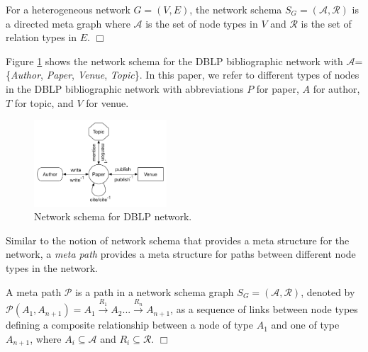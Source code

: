 \begin{definition}For a heterogeneous network $G=(V,E)$, the network schema $S_G=\mathcal{(A,R)}$ is a directed meta graph where $\mathcal{A}$ is the set of node types in $V$ and $\mathcal{R}$ is the set of relation types in $E$.  $\Box$\end{definition}

Figure \ref{schema} shows the network schema for the DBLP bibliographic network with $\mathcal{A}$=\{\textit{Author}, \textit{Paper}, \textit{Venue}, \textit{Topic}\}. In this paper, we refer to different types of nodes in the DBLP bibliographic network with abbreviations $P$ for paper, $A$ for author, $T$ for topic, and $V$ for venue. 

\begin{figure}[t]
\centering
\includegraphics[trim = 0mm 10mm 0mm 0mm,width=0.44\textwidth]{figs/schema.pdf}
\caption{Network schema for DBLP network.}\label{schema}
\end{figure}


Similar to the notion of network schema that provides a meta structure for the network, a \textit{meta path} \cite{sun2011pathsim} provides a meta structure for paths between different node types in the network. 

\begin{definition}A meta path $\mathcal{P}$ is a path in a network schema graph $S_G = (\mathcal{A,R})$, denoted by $\mathcal{P}(A_1,A_{n+1}) = A_1 \xrightarrow{R_1} A_2... \xrightarrow{R_n} A_{n+1}$, as a sequence of links between node types defining a composite relationship between a node of type $A_1$ and one of type $A_{n+1}$, where $A_i \subseteq \mathcal{A}$ and $R_i \subseteq \mathcal{R}$. $\Box$\end{definition}

